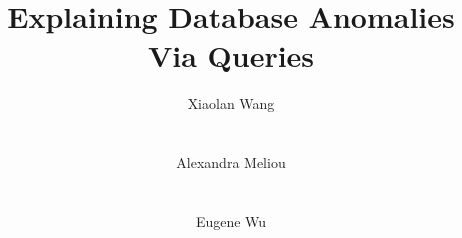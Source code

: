 






\newcommand{\red}[1]{\textcolor{red}{#1}}
\newcommand{\green}[1]{\textcolor{green}{#1}}
\newcommand{\blue}[1]{\textcolor{blue}{#1}}
\newcommand{\orange}[1]{\textcolor{orange}{#1}}
\newcommand{\darkred}[1]{\textcolor{darkred}{#1}}
\newcommand{\darkgreen}[1]{\textcolor{darkgreen}{#1}}
\newcommand{\darkblue}[1]{\textcolor{darkblue}{#1}}


\newcommand{\alx}[1]{\noindent{\textcolor{red}{Ted: #1}}}
\newcommand{\xlw}[1]{\noindent{\textcolor{red}{Aditya: #1}}}
\newcommand{\ewu}[1]{\noindent{\textcolor{red}{EWu: #1}}}
\newcommand{\stitle}[1]{\vspace{0.5em}\noindent\textbf{#1}}
\newcommand{\calF}[0]{$\cal{F}$}
\newcommand{\codesize}{\fontsize{7}{8}}
\newcommand{\xxx}[1]{{\fontsize{13pt}{13pt}\selectfont\textcolor{red}{#1}}}
\newcommand{\ind}{\hspace{\algorithmicindent}}
\newcommand{\sys}{{\sc THESYSTEM}\xspace}
\newcommand{\gcost}{{\sc Greedy-Cost}\xspace}










\title{Explaining Database Anomalies Via Queries}

\author{
  \alignauthor Xiaolan Wang\\
    \\
    \\
  \alignauthor Alexandra Meliou\\
    \\
    \\
  \alignauthor Eugene Wu\\
    \\
    \\
}



